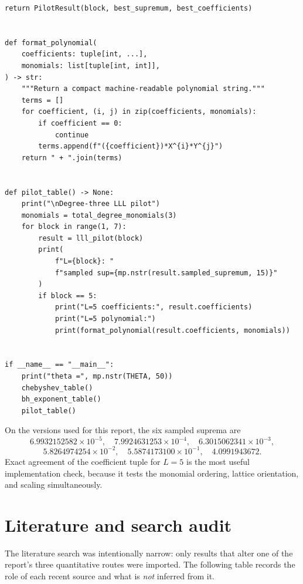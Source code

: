 \documentclass[11pt,oneside]{article}
\theoremstyle{definition}
\theoremstyle{remark}
\begin{document}
\begin{lstlisting}[style=pythonstyle,caption={Reproduction of the numerical tables and the degree-three LLL pilot.}]
    return PilotResult(block, best_supremum, best_coefficients)


def format_polynomial(
    coefficients: tuple[int, ...],
    monomials: list[tuple[int, int]],
) -> str:
    """Return a compact machine-readable polynomial string."""
    terms = []
    for coefficient, (i, j) in zip(coefficients, monomials):
        if coefficient == 0:
            continue
        terms.append(f"({coefficient})*X^{i}*Y^{j}")
    return " + ".join(terms)


def pilot_table() -> None:
    print("\nDegree-three LLL pilot")
    monomials = total_degree_monomials(3)
    for block in range(1, 7):
        result = lll_pilot(block)
        print(
            f"L={block}: "
            f"sampled sup={mp.nstr(result.sampled_supremum, 15)}"
        )
        if block == 5:
            print("L=5 coefficients:", result.coefficients)
            print("L=5 polynomial:")
            print(format_polynomial(result.coefficients, monomials))


if __name__ == "__main__":
    print("theta =", mp.nstr(THETA, 50))
    chebyshev_table()
    bh_exponent_table()
    pilot_table()
\end{lstlisting}

On the versions used for this report, the six sampled suprema are
\[
  6.9932152582\times10^{-5},\quad
  7.9924631253\times10^{-4},\quad
  6.3015062341\times10^{-3},
\]
\[
  5.8264974254\times10^{-2},\quad
  5.5874173100\times10^{-1},\quad
  4.0991943672.
\]
Exact agreement of the coefficient tuple for $L=5$ is the most useful implementation check,
because it tests the monomial ordering, lattice orientation, and scaling simultaneously.

\section{Literature and search audit}
\label{app:literature}

The literature search was intentionally narrow: only results that alter one of the report's three
quantitative routes were imported.  The following table records the role of each recent source and
what is \emph{not} inferred from it.
\end{document}

